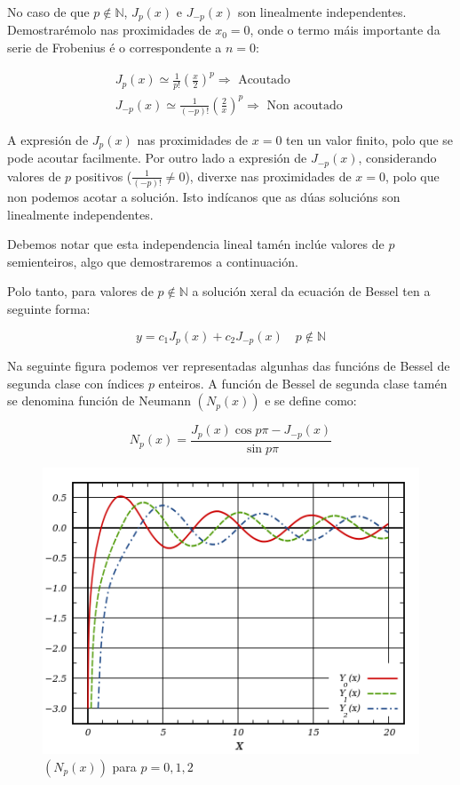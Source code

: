 \documentclass[a4paper,12pt,titlepage]{article}
\begin{document}
\par No caso de que $p\notin \mathbb{N}$, $J_p(x)$ e $J_{-p}(x)$ son linealmente independentes. Demostrarémolo nas proximidades de $x_0=0$, onde o termo máis importante da serie de Frobenius é o correspondente a $n=0$:

$$
\begin{gathered}
    J_{p}(x) \simeq \frac{1}{p !}\left(\frac{x}{2}\right)^{p} \Rightarrow \text { Acoutado } \\
    J_{-p}(x) \simeq \frac{1}{(-p) !}\left(\frac{2}{x}\right)^{p} \Rightarrow \text { Non acoutado }
\end{gathered}
$$

A expresión de $J_p(x)$ nas proximidades de $x=0$ ten un valor
finito, polo que se pode acoutar facilmente. Por outro lado a expresión de $J_{-p}(x)$, considerando valores de $p$ positivos ($\frac{1}{(-p)!}\neq0$), diverxe nas proximidades de $x=0$, polo que non podemos acotar a solución. Isto indícanos que as dúas solucións son linealmente independentes.

\par Debemos notar que esta independencia lineal tamén inclúe valores de $p$ semienteiros, algo que demostraremos a continuación.

\par Polo tanto, para valores de $p\notin \mathbb{N}$ a solución xeral da ecuación de Bessel ten a seguinte forma:

\begin{equation*}
    y = c_1J_p(x) + c_2J_{-p}(x) \quad p\notin \mathbb{N}
\end{equation*}

Na seguinte figura podemos ver representadas algunhas das funcións de Bessel de segunda clase con índices $p$ enteiros. A función de Bessel de segunda clase tamén se denomina función de Neumann $(N_p(x))$ e se define como:

\begin{equation*}
    N_p(x) = \frac{J_p(x)\cos p\pi - J_{-p}(x)}{\sin p\pi}
\end{equation*}

\begin{figure}[h!]
    \centering
    \includegraphics[width=0.75\linewidth]{Images/bessel2especie.png}
    \caption{$(N_p(x))$ para $p=0,1,2$}
\end{figure}
\end{document}
